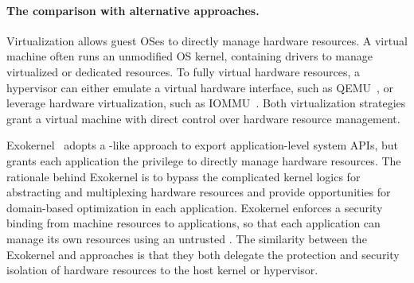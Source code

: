 \paragraph{The comparison with alternative approaches.}
Virtualization allows guest OSes to directly manage hardware resources. %
A virtual machine often runs an unmodified OS kernel,
containing drivers to manage virtualized or dedicated resources.
To fully virtual hardware resources,
a hypervisor can either emulate a virtual hardware interface,
such as QEMU~\cite{qemu}, or leverage hardware virtualization,
such as IOMMU~\cite{VT-d}.
Both virtualization strategies grant a virtual machine with direct control over hardware resource management. %




Exokernel~\cite{engler95exokernel} adopts a \libos{}-like approach
to export application-level system APIs, but grants each application the privilege to directly manage hardware resources. 
The rationale behind Exokernel is to bypass the complicated kernel logics
for abstracting and multiplexing hardware resources
and provide opportunities for domain-based optimization in each application.
Exokernel enforces a security binding from machine resources to applications,
so that each application can
manage its own resources using an untrusted \libos{}.
The similarity between the Exokernel and \graphene{} approaches is that
they both delegate the protection and security isolation of hardware resources to the host kernel or hypervisor.


